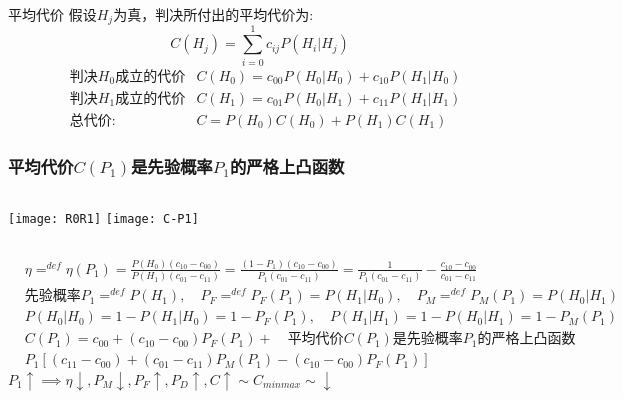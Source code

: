 \begin{frame}{平均代价}
假设$H_j$为真，判决所付出的平均代价为:
\[C(H_j)=\sum\limits_{i=0}^{1}c_{ij}P(H_i|H_j) \]
\begin{align*}
&\text{判决$H_0$成立的代价} &C(H_0)=c_{00}P(H_0|H_0)+c_{10}P(H_1|H_0)\\
&\text{判决$H_1$成立的代价} &C(H_1)=c_{01}P(H_0|H_1)+c_{11}P(H_1|H_1)\\
&\text{总代价:} &C=P(H_0)C(H_0)+P(H_1)C(H_1)
\end{align*}
\end{frame}

\begin{frame}[shrink]
\frametitle{平均代价$C(P_1)$是先验概率$P_1$的严格上凸函数}
\begin{columns}%
\texttt{[image: R0R1]}
\texttt{[image: C-P1]}
\end{columns}
\begin{align*}
&\eta\mathop{=}^{def}\eta(P_1)=\frac{P(H_0)(c_{10}-c_{00})}{P(H_1)(c_{01}-c_{11})}=\frac{(1-P_1)(c_{10}-c_{00})}{P_1(c_{01}-c_{11})}=\frac{1}{P_1(c_{01}-c_{11})}-\frac{c_{10}-c_{00}}{c_{01}-c_{11}}\\
&\text{先验概率}P_1\mathop{=}^{def}P(H_1),\quad P_F\mathop{=}^{def}P_F(P_1)=P(H_1|H_0),\quad  P_M\mathop{=}^{def}P_M(P_1)=P(H_0|H_1)\\
&P(H_0|H_0)=1-P(H_1|H_0)=1-P_F(P_1),\quad P(H_1|H_1)=1-P(H_0|H_1)=1-P_M(P_1)\\
&C(P_1)=c_{00}+(c_{10}-c_{00})P_F(P_1)+  \quad \textbf{平均代价$C(P_1)$是先验概率$P_1$的严格上凸函数}\\
&P_1[(c_{11}-c_{00})+(c_{01}-c_{11})P_M(P_1)-(c_{10}-c_{00})P_F(P_1)]
\end{align*}
$P_1\uparrow\implies \eta\downarrow, P_M\downarrow, P_F\uparrow, P_D\uparrow, C\uparrow\sim C_{minmax}\sim\downarrow$
\end{frame}

